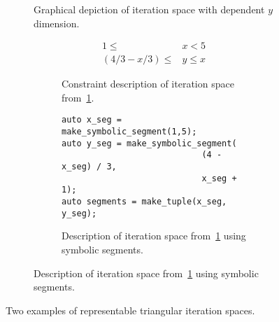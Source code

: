 \begin{figure}
\vspace{10pt}

\begin{subfigure}{0.4\columnwidth}
\caption{Graphical depiction of iteration space with dependent $y$ dimension.}\label{triangularIterationSpace2}
\end{subfigure}
\hspace{0.05\columnwidth}
\begin{subfigure}{0.55\columnwidth}
\begin{subfigure}{\columnwidth}
\begin{align}
	1 \leq &x < 5 \\
	(4/3 - x/3) \leq &y \leq x
\end{align}
\caption{Constraint description of iteration space from~\ref{triangularIterationSpace2}.}\label{constraintDescription2}
\end{subfigure}

\vspace{20pt}

\begin{subfigure}{\columnwidth}
\begin{lstlisting}[]
auto x_seg = make_symbolic_segment(1,5);
auto y_seg = make_symbolic_segment(
							(4 - x_seg) / 3, 
							x_seg + 1);
auto segments = make_tuple(x_seg, y_seg);
\end{lstlisting}
\caption{Description of iteration space from~\ref{triangularIterationSpace2} using symbolic segments.}\label{symseg2}
\end{subfigure}
\end{subfigure}
\caption{Two examples of representable triangular iteration spaces.}\label{goodTriangles}
\end{figure}



